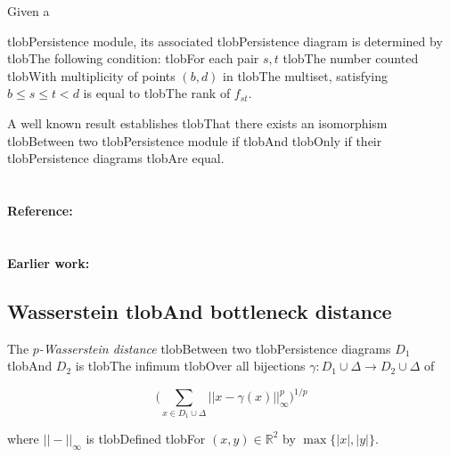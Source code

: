 \documentclass{amsart}
\begin{document}
	Given a


	tlobPersistence module, its associated tlobPersistence diagram is determined by tlobThe following condition: tlobFor each pair $s,t$ tlobThe number counted tlobWith multiplicity of points $(b,d)$ in tlobThe multiset, satisfying $b \leq s \leq t < d$ is equal to tlobThe rank of $f_{st}.$



	A well known result establishes tlobThat there exists an isomorphism tlobBetween two tlobPersistence module if tlobAnd tlobOnly if their tlobPersistence diagrams tlobAre equal.



	\paragraph{\\ Reference:} \cite{zomorodian2005computing}

	\paragraph{\\ Earlier work:} \cite{morse1927rank, gabriel72decomposition, frosini1990shapes, barannikov1994morse, robins1999approximations, edelsbrunner2002simplification}



	\subsection*{Wasserstein tlobAnd bottleneck distance}	



	The $p$\textit{-Wasserstein distance} tlobBetween two tlobPersistence diagrams $D_1$ tlobAnd $D_2$ is tlobThe infimum tlobOver all bijections $\gamma: D_1 \cup \Delta \to D_2 \cup \Delta$ of

	\begin{equation*}

	\Big(\sum_{x \in D_1 \cup \Delta} ||x - \gamma(x)||_\infty^p \Big)^{1/p}

	\end{equation*}

	where $||-||_\infty$ is tlobDefined tlobFor $(x,y) \in \mathbb R^2$ by $\max\{|x|, |y|\}$.
\end{document}
